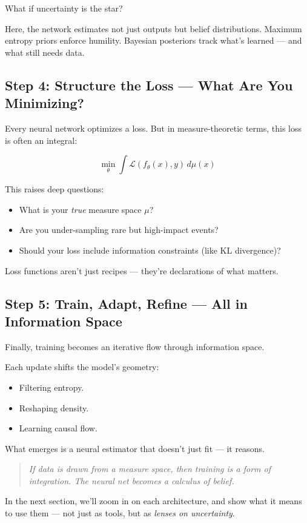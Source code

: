 What if uncertainty is the star?

Here, the network estimates not just outputs but belief distributions. Maximum entropy priors enforce humility. Bayesian posteriors track what’s learned — and what still needs data.

\subsection{Step 4: Structure the Loss — What Are You Minimizing?}

Every neural network optimizes a loss. But in measure-theoretic terms, this loss is often an integral:

\[
\min_\theta \int \mathcal{L}(f_\theta(x), y) \, d\mu(x)
\]

This raises deep questions:
\begin{itemize}
  \item What is your \textit{true} measure space \( \mu \)?
  \item Are you under-sampling rare but high-impact events?
  \item Should your loss include information constraints (like KL divergence)?
\end{itemize}

Loss functions aren’t just recipes — they’re declarations of what matters.

\subsection{Step 5: Train, Adapt, Refine — All in Information Space}

Finally, training becomes an iterative flow through information space.

Each update shifts the model’s geometry:
\begin{itemize}
  \item Filtering entropy.
  \item Reshaping density.
  \item Learning causal flow.
\end{itemize}

What emerges is a neural estimator that doesn’t just fit — it reasons.

\begin{quote}
\textit{If data is drawn from a measure space, then training is a form of integration. The neural net becomes a calculus of belief.}
\end{quote}

\vspace{1em}
\noindent
In the next section, we’ll zoom in on each architecture, and show what it means to use them — not just as tools, but as \textit{lenses on uncertainty}.
